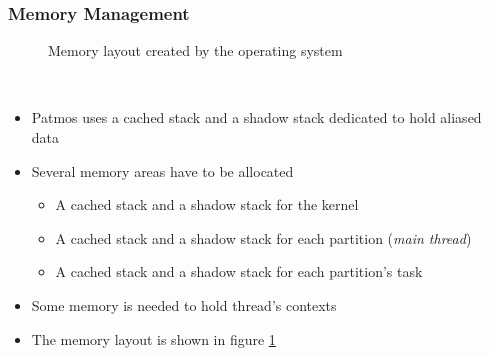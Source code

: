 \documentclass[notheorems]{beamer}
\begin{document}
\begin{frame}
\frametitle{Memory Management}

\begin{minipage}[c]{.35\textwidth}
	\begin{figure}[!ht]
		\begin{center}
		\end{center}
		\caption{Memory layout created by the operating system}
		\label{fig:memory layout}
	\end{figure}
\end{minipage}~
\begin{minipage}[c]{.6\textwidth}
\begin{itemize}
	\item Patmos uses a cached stack and a shadow stack dedicated to hold aliased data
	\item Several memory areas have to be allocated
		\begin{itemize}
			\item A cached stack and a shadow stack for the kernel
			\item A cached stack and a shadow stack for each partition (\textit{main thread})
			\item A cached stack and a shadow stack for each partition's task
		\end{itemize}
	\item Some memory is needed to hold thread's contexts
	\item The memory layout is shown in figure \ref{fig:memory layout}
\end{itemize}
\end{minipage}
\end{frame}
\end{document}

